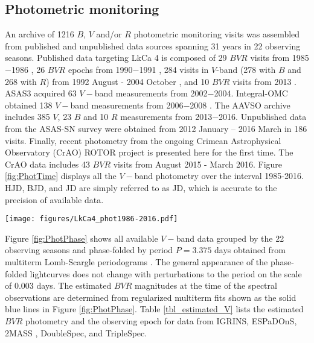 \documentclass[twocolumn]{emulateapj}%
\newcommand{\name}{LkCa 4 }
\begin{document}
\subsection{Photometric monitoring}

An archive of 1216 $B$, $V$ and/or $R$ photometric monitoring visits was assembled from published and unpublished data sources spanning 31 years in 22 observing seasons.  Published data targeting \name is composed of 29 $BVR$ visits from 1985$-$1986 \citep{vrba93}, 26 $BVR$ epochs from 1990$-$1991 \citep{bouvier93}, 284 visits in $V$-band (278 with $B$ and 268 with $R$) from 1992 August - 2004 October \citep{grankin08}, and 10 $BVR$ visits from 2013 \citep{donati14}.  ASAS3 \citep{pojmanski04} acquired 63 $V-$band measurements from 2002$-$2004.  Integral-OMC obtained 138 $V-$band measurements from 2006$-$2008 \citep{garzon12}.  The AAVSO archive \citep{kafka16} includes 385 $V$, 23 $B$ and 10 $R$ measurements from 2013$-$2016.  Unpublished data from the ASAS-SN survey \citep{shappee14} were obtained from 2012 January -- 2016 March in 186 visits.  Finally, recent photometry from the ongoing Crimean Astrophysical Observatory (CrAO) ROTOR project \citep{grankin08} is presented here for the first time.  The CrAO data includes 43 $BVR$ visits from August 2015 - March 2016. Figure \ref{fig:PhotTime} displays all the $V-$band photometry over the interval 1985-2016.  HJD, BJD, and JD are simply referred to as JD, which is accurate to the precision of available data.


\begin{figure*}
 \centering
 \texttt{[image: figures/LkCa4\_phot1986-2016.pdf]}
 \caption{Overview of \name $V-$band photometric monitoring from 1986$-$2016.  The vertical lines denote the observing epochs of 2MASS, IGRINS, ESPaDOnS, DoubleSpec, and TripleSpec.  The near contemporaneous DoubleSpec and TripleSpec epochs lay on top of each other on this scale, as do the 12 ESPaDOnS epochs.  The abscissa range is equal to the current lifespan of the first author of this paper.}
 \label{fig:PhotTime}
\end{figure*}

Figure \ref{fig:PhotPhase} shows all available $V-$band data grouped by the 22 observing seasons and phase-folded by period $P=3.375$ days obtained from multiterm Lomb-Scargle periodograms \citep{ivezic14}.  The general appearance of the phase-folded lightcurves does not change with perturbations to the period on the scale of 0.003 days.  The estimated $BVR$ magnitudes at the time of the spectral observations are determined from regularized multiterm fits \citep{vanderplas15a} shown as the solid blue lines in Figure \ref{fig:PhotPhase}.  Table \ref{tbl_estimated_V} lists the estimated $BVR$ photometry and the observing epoch for data from IGRINS, ESPaDOnS, 2MASS \citep{skrutskie06}, DoubleSpec, and TripleSpec.  
\end{document}
